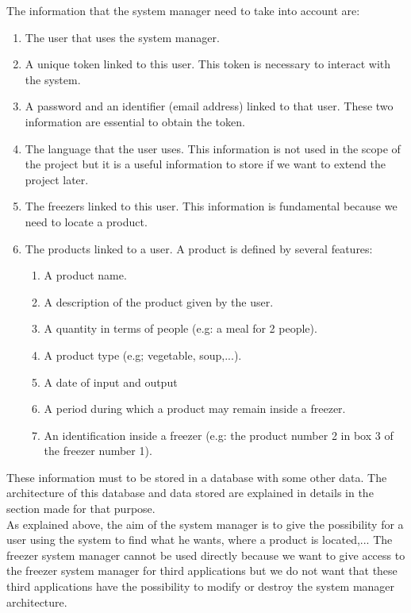 The information that the system manager need to take into account are:
\begin{enumerate}
\item The user that uses the system manager.
\item A unique token linked to this user. This token is necessary to interact with the system.
\item A password and an identifier (email address) linked to that user. These two information are essential to obtain the token.
\item The language that the user uses. This information is not used in the scope of the project but it is a useful information to store if we want to extend the project later.
\item The freezers linked to this user. This information is fundamental because we need to locate a product.
\item The products linked to a user. A product is defined by several features: 
\begin{enumerate}
\item A product name.
\item A description of the product given by the user.
\item A quantity in terms of people (e.g: a meal for 2 people).
\item A product type (e.g; vegetable, soup,...).
\item A date of input and output
\item A period during which a product may remain inside a freezer.
\item An identification inside a freezer (e.g: the product number 2 in box 3 of the freezer number 1).
\end{enumerate}
\end{enumerate}

These information must to be stored in a database with some other data. The architecture of this database and data stored are explained in details in the section made for that purpose.\\

As explained above, the aim of the system manager is to give the possibility for a user using the system to find what he wants, where a product is located,... The freezer system manager cannot be used directly because we want to give access to the freezer system manager for third applications but we do not want that these third applications have the possibility to modify or destroy the system manager architecture.\\

